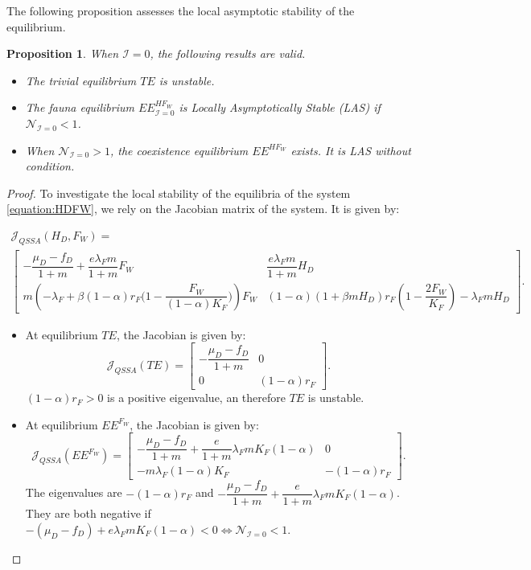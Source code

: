 \documentclass{article}
\newcommand{\lfw}{\lambda_{F}}
\newcommand{\lfw}{\lambda_{F}}
\newcommand{\cI}{\mathcal{I}}
\newtheorem{prop}[theorem]{Proposition}
\theoremstyle{definition}
\theoremstyle{remark}
\begin{document}
The following proposition assesses the local asymptotic stability of the equilibrium.

\begin{prop}\label{prop:stab 2D, cI=0}
When $\cI =0$, the following results are valid.
\begin{itemize}
\item The trivial equilibrium $TE$ is unstable.
\item The fauna equilibrium $EE^{HF_W}_{\cI = 0}$ is Locally Asymptotically Stable (LAS) if $\mathcal{N}_{\cI = 0} < 1$.
\item When $\mathcal{N}_{\cI = 0} > 1$, the coexistence equilibrium $EE^{HF_W}$ exists. It is LAS without condition.
\end{itemize}
\end{prop}

\begin{proof}
To investigate the local stability of the equilibria of the system \eqref{equation:HDFW}, we rely on the Jacobian matrix of the system. It is given by:

\begin{multline}
\mathcal{J}_{QSSA}(H_D, F_W) = \\ \begin{bmatrix}
- \dfrac{\mu_D - f_D}{1+m} + \dfrac{e \lfw m}{1+m}  F_W & \dfrac{e \lfw m}{1+m}  H_D \\
m\left(-\lfw + \beta (1-\alpha) r_F \Big(1- \dfrac{F_W}{(1-\alpha)K_F} \Big) \right) F_W & (1-\alpha) (1+\beta m H_D) r_F \left(1 - \dfrac{2F_W}{K_F} \right) - \lfw m H_D
\end{bmatrix}.
\label{equation:Jqssa}
\end{multline}

\begin{itemize}
\item At equilibrium $TE$, the Jacobian is given by:
\begin{equation*}
\mathcal{J}_{QSSA}(TE) = \begin{bmatrix}
- \dfrac{\mu_D - f_D}{1+m} &0 \\
0 & (1-\alpha)  r_F 
\end{bmatrix}.
\end{equation*}
$(1-\alpha) r_F > 0$ is a positive eigenvalue, an therefore $TE$ is unstable.

\item At equilibrium $EE^{F_W}$, the Jacobian is given by: 
\begin{equation*}
\mathcal{J}_{QSSA}(EE^{F_W}) = \begin{bmatrix}
- \dfrac{\mu_D - f_D}{1+m} + \dfrac{e}{1+m}\lfw m K_F(1-\alpha) &0 \\
- m \lfw (1-\alpha)K_F & -(1-\alpha)  r_F 
\end{bmatrix}.
\end{equation*}
The eigenvalues are $-(1-\alpha)  r_F$ and $- \dfrac{\mu_D - f_D}{1+m} + \dfrac{e}{1+m}\lfw m K_F(1-\alpha)$. They are both negative if $-(\mu_D - f_D) + e\lfw m K_F(1-\alpha) <0 \Leftrightarrow \mathcal{N}_{\cI = 0} < 1$.


\end{itemize}
\end{proof}
\end{document}
